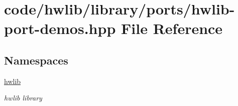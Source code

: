 \hypertarget{hwlib-port-demos_8hpp}{}\section{code/hwlib/library/ports/hwlib-\/port-\/demos.hpp File Reference}
\label{hwlib-port-demos_8hpp}
\subsection*{Namespaces}
\begin{DoxyCompactItemize}
\item 
 \hyperlink{namespacehwlib}{hwlib}
\begin{DoxyCompactList}\small\item\em hwlib library \end{DoxyCompactList}\end{DoxyCompactItemize}
